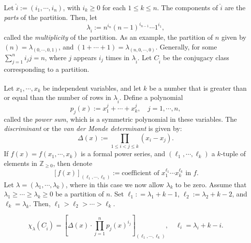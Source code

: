 \documentclass[a4paper]{report}
\theoremstyle{definition}
\theoremstyle{remark}
\theoremstyle{proposition}
\theoremstyle{conjecture}
\theoremstyle{lemma}
\theoremstyle{corollary}
\theoremstyle{exercise}
\theoremstyle{example}
\begin{document}
Let $\widehat{i} := (i_1,\cdots,i_n)$, with $i_k\geq 0$ for each $1\leq k \leq n$. The components of $\widehat{i}$ are the \emph{parts} of the partition.
Then, let $$\lambda_{\widehat{i}} := n^{i_n} (n-1)^{i_{n-1}} \cdots 1^{i_1},$$
called the \emph{multiplicity} of the partition.
As an example, the partition of $n$ given by $(n) = \lambda_{(0,\cdots,0,1)}$,
and $(1+\cdots+1) = \lambda_{(n,0,\cdots,0)}$.
Generally, for some $\sum_{j=1}^n i_jj = n$, where $j$ appears $i_j$ times in $\lambda_{\widehat{i}}$.
Let $C_{\widehat{i}}$ be the conjugacy class corresponding to a partition.\\\\
Let $x_1,\cdots,x_k$ be independent variables, and let $k$ be a number 
that is greater than or equal than the number of rows in $\lambda_{\widehat{i}}$.
Define a polynomial
$$p_j(x) := x_1^j + \cdots + x_k^j,\quad j=1,\cdots,n,$$
called the \emph{power sum}, which is a symmetric polynomial in these variables.
The \emph{discriminant} or the \emph{van der Monde determinant} is given by:
$$\Delta(x) := \prod_{1\leq i < j \leq k} (x_i-x_j).$$
If $f(x)=f(x_1,\cdots,x_k)$ is a formal power series, and 
$(\ell_1,\cdots,\ell_k)$ a $k$-tuple of elements in $\mathbb{Z}_{\geq 0}$,
then denote 
$$[f(x)]_{(\ell_1,\cdots,\ell_k)} := \text{coefficient of $x_1^{\ell_1}\cdots x_k^{\ell_k}$ in $f$}.$$
Let $\lambda = (\lambda_1,\cdots,\lambda_k)$, where in this case we now allow 
$\lambda_k$ to be zero. Assume that $\lambda_1\geq \cdots \geq\lambda_k\geq 0$ be a partition of $n$. Set 
$\ell_1 : =\lambda_1 + k-1$, $\ell_2:= \lambda_2 + k -2$, and $\ell_k=\lambda_k$.
Then, $\ell_1 > \ell_2 > \cdots > \ell_k$.
\begin{theorem}
    $$\chi_\lambda(C_{\widehat{i}}) = \left[\Delta(x) \cdot \prod_{j=1}^n p_j(x)^{i_j}\right]_{(\ell_1,\cdots,\ell_k)}, \quad \ell_i = \lambda_i + k-i.$$
\end{theorem}
\end{document}
